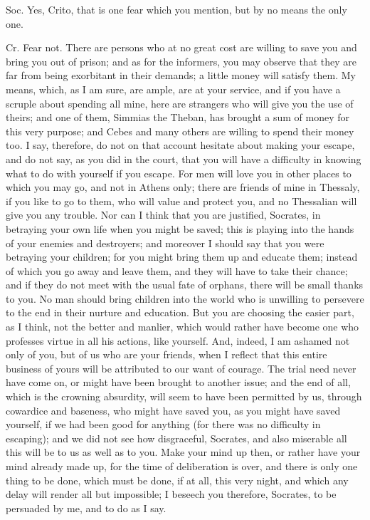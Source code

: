 Soc. Yes, Crito, that is one fear which you mention, but by no means
the only one. 

Cr. Fear not. There are persons who at no great cost are willing to
save you and bring you out of prison; and as for the informers, you
may observe that they are far from being exorbitant in their demands;
a little money will satisfy them. My means, which, as I am sure, are
ample, are at your service, and if you have a scruple about spending
all mine, here are strangers who will give you the use of theirs;
and one of them, Simmias the Theban, has brought a sum of money for
this very purpose; and Cebes and many others are willing to spend
their money too. I say, therefore, do not on that account hesitate
about making your escape, and do not say, as you did in the court,
that you will have a difficulty in knowing what to do with yourself
if you escape. For men will love you in other places to which you
may go, and not in Athens only; there are friends of mine in Thessaly,
if you like to go to them, who will value and protect you, and no
Thessalian will give you any trouble. Nor can I think that you are
justified, Socrates, in betraying your own life when you might be
saved; this is playing into the hands of your enemies and destroyers;
and moreover I should say that you were betraying your children; for
you might bring them up and educate them; instead of which you go
away and leave them, and they will have to take their chance; and
if they do not meet with the usual fate of orphans, there will be
small thanks to you. No man should bring children into the world who
is unwilling to persevere to the end in their nurture and education.
But you are choosing the easier part, as I think, not the better and
manlier, which would rather have become one who professes virtue in
all his actions, like yourself. And, indeed, I am ashamed not only
of you, but of us who are your friends, when I reflect that this entire
business of yours will be attributed to our want of courage. The trial
need never have come on, or might have been brought to another issue;
and the end of all, which is the crowning absurdity, will seem to
have been permitted by us, through cowardice and baseness, who might
have saved you, as you might have saved yourself, if we had been good
for anything (for there was no difficulty in escaping); and we did
not see how disgraceful, Socrates, and also miserable all this will
be to us as well as to you. Make your mind up then, or rather have
your mind already made up, for the time of deliberation is over, and
there is only one thing to be done, which must be done, if at all,
this very night, and which any delay will render all but impossible;
I beseech you therefore, Socrates, to be persuaded by me, and to do
as I say. 

